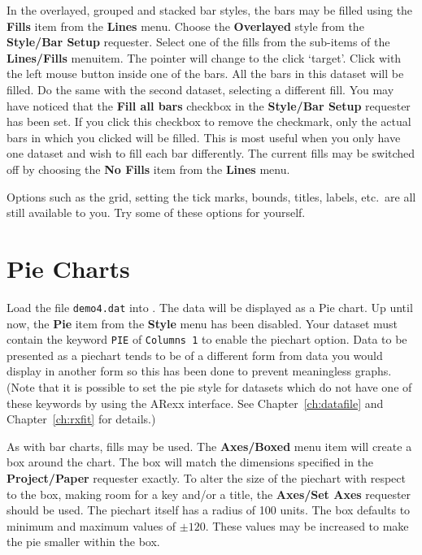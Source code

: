 In the overlayed, grouped and stacked bar styles, the bars may be filled using 
the {\bf Fills} item from the {\bf Lines} menu. 
Choose the {\bf Overlayed} style from the {\bf Style/Bar Setup} requester.
Select one of the fills from the sub-items of the {\bf Lines/Fills} menuitem.
The pointer will change to the click `target'. Click with the 
left mouse button inside one of the bars.
All the bars in this dataset will be filled. Do the same 
with the second dataset, selecting a different fill. You may have noticed that 
the {\bf Fill all bars} checkbox in the {\bf Style/Bar Setup} 
requester has been set. If you click this checkbox to remove the checkmark,
only the actual bars in which you clicked will be filled. This is most useful when 
you only have one dataset and wish to fill each bar differently. The current fills 
may be switched off by choosing the {\bf No Fills} item from the {\bf Lines} menu.

Options such as the grid, setting the tick 
marks, bounds, titles, labels, etc.\ are all still available to you.
Try some of these options for yourself.







\section{Pie Charts}
\label{sect:pie}
Load the file {\tt demo4.dat} into \amplot. The data will be 
displayed 
as a Pie chart. Up until now, the {\bf Pie} item from the {\bf Style} menu has been 
disabled. Your dataset must contain the keyword {\tt PIE} of {\tt Columns 1} to 
enable the piechart option. Data to be presented as a piechart tends to be of a 
different form from data you would display in another form so this has been done to 
prevent meaningless graphs. (Note that it is possible to set the pie style for 
datasets which do not have one of these keywords by using  the ARexx interface. See 
Chapter~\ref{ch:datafile} and Chapter~\ref{ch:rxfit} for details.)

As with bar charts, fills may be used.
The {\bf Axes/Boxed} menu item will create a box around the chart. The box will 
match the dimensions specified in the {\bf Project/Paper} requester exactly.
To alter the size of the piechart with respect to the box, making room for a key 
and/or a title, the {\bf Axes/Set Axes} requester should be used. The piechart 
itself has a radius of 100 units. The box defaults to minimum 
and maximum values of $\pm120$. These values may be increased to make the 
pie smaller within the box.

